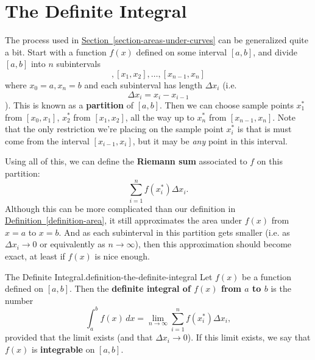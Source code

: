 \documentclass[10pt,]{book}
\newcommand{\terminology}[1]{\textbf{#1}}
\numberwithin{equation}{section}
\begin{document}
\section[{The Definite Integral}]{The Definite Integral}\label{section-the-definite-integral}
\hypertarget{p-425}{}%
The process used in \hyperref[section-areas-under-curves]{Section~\ref{section-areas-under-curves}} can be generalized quite a bit. Start with a function \(f(x)\) defined on some interval \([a,b]\), and divide \([a,b]\) into \(n\) subintervals%
\begin{equation*}
[x_{0},x_{1}], [x_{1},x_{2}],\ldots,[x_{n-1},x_{n}]
\end{equation*}
where \(x_{0} = a, x_{n} = b\) and each subinterval has length \(\Delta x_{i}\) (i.e.%
\begin{equation*}
\Delta x_{i} = x_{i} - x_{i-1}
\end{equation*}
). This is known as a \terminology{partition} of \([a,b]\). Then we can choose sample points \(x_{1}^{*}\) from \([x_{0},x_{1}]\), \(x_{2}^{*}\) from \([x_{1},x_{2}]\), all the way up to \(x_{n}^{*}\) from \([x_{n-1},x_{n}]\). Note that the only restriction we're placing on the sample point \(x_{i}^{*}\) is that is must come from the interval \([x_{i-1},x_{i}]\), but it may be \emph{any} point in this interval.%
\par
\hypertarget{p-426}{}%
Using all of this, we can define the \terminology{Riemann sum} associated to \(f\) on this partition:%
\begin{equation*}
\sum_{i=1}^{n}f(x_{i}^{*})\Delta x_{i}.
\end{equation*}
Although this can be more complicated than our definition in \hyperref[definition-area]{Definition~\ref{definition-area}}, it still approximates the area under \(f(x)\) from \(x=a\) to \(x=b\). And as each subinterval in this partition gets smaller (i.e. as \(\Delta x_{i}\to0\) or equivalently as \(n\to\infty\)), then this approximation should become exact, at least if \(f(x)\) is nice enough.%
\begin{definition}{The Definite Integral.}{definition-the-definite-integral}%
\hypertarget{p-427}{}%
Let \(f(x)\) be a function defined on \([a,b]\). Then the \terminology{definite integral of \(f(x)\) from \(a\) to \(b\)} is the number%
\begin{equation*}
\int_{a}^{b}f(x)\,dx = \lim_{n\to\infty}\sum_{i=1}^{n}f(x_{i}^{*})\Delta x_{i},
\end{equation*}
provided that the limit exists (and that \(\Delta x_{i}\to0\)). If this limit exists, we say that \(f(x)\) is \terminology{integrable} on \([a,b]\).%
\end{definition}
\end{document}
